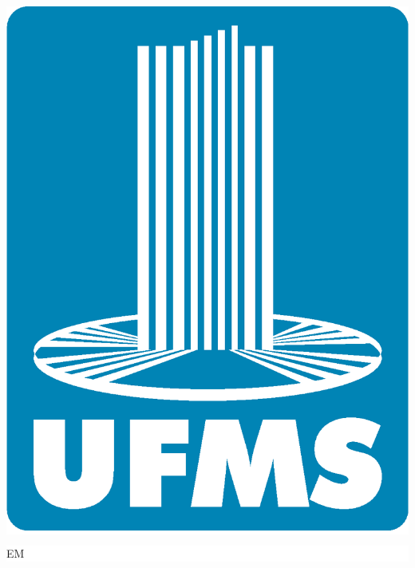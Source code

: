 
\begin{center}
	\colorbox{white}{\begin{minipage}[t][3.1cm][t]{\textwidth}
		\begin{center}
			\centerline{\includegraphics[scale=.18]{figuras/logo-ufms.eps}}
		\end{center}
	\end{minipage}}

	\vskip 0.5cm
	
	\colorbox{white}{\begin{minipage}[t][1.6cm][t]{\textwidth}
			\begin{center}
				{\fontsize{14pt}{14pt}\selectfont \MakeUppercase{\instituicaoTRAB}} \break
				{\fontsize{12pt}{12pt}\selectfont \MakeUppercase{\campusInstituicaoTRAB}} \break
				{\fontsize{12pt}{12pt}\selectfont \MakeUppercase{{\grauCursoTRAB } em { \cursoTRAB}}}
			\end{center}
	\end{minipage}}
	

\end{center}
